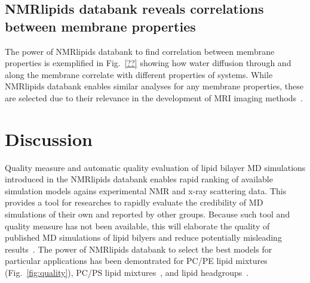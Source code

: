 \documentclass[fleqn,10pt]{wlscirep}
\begin{document}
\subsection{NMRlipids databank reveals correlations between membrane properties}
The power of NMRlipids databank to find correlation between membrane properties is exemplified in Fig.~\ref{??} showing how water diffusion through and along the membrane correlate with different properties of systems. While NMRlipids databank enables similar analyses for any membrane properties, these are selected due to their relevance in the development of MRI imaging methods~\cite{??}.  






 

\section{Discussion}


Quality measure and automatic quality evaluation of lipid bilayer MD simulations introduced in the NMRlipids databank enables rapid ranking of available simulation models agains experimental NMR and x-ray scattering data. This provides a tool for researches to rapidly evaluate the credibility of MD simulations of their own and reported by other groups. Because such tool and quality measure has not been available, this will elaborate the quality of published MD simulations of lipid bilyers and reduce potentially misleading results~\cite{antila22b}. The power of NMRlipids databank to select the best models for particular applications has been demontrated for PC/PE lipid mixtures (Fig.~\ref{fig:quality}), PC/PS lipid mixtures~\cite{antila22b}, and lipid headgroups~\cite{bacle21}.
\end{document}

